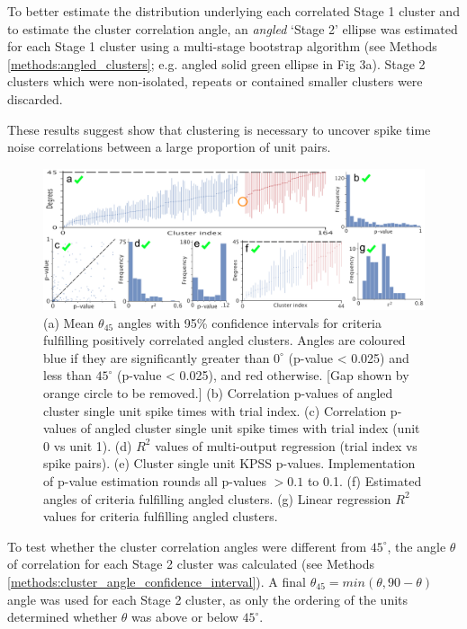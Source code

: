 \documentclass{article}
\begin{document}
To better estimate the distribution underlying each correlated Stage 1 cluster and to estimate the cluster correlation angle, an \textit{angled} `Stage 2' ellipse was estimated for each Stage 1 cluster using a multi-stage bootstrap algorithm (see Methods \ref{methods:angled_clusters}; e.g. angled solid green ellipse in Fig 3a).
Stage 2 clusters which were non-isolated, repeats or contained smaller clusters were discarded. 

These results suggest show that clustering is necessary to uncover spike time noise correlations between a large proportion of unit pairs.

\begin{figure}[t!]
\centering
\includegraphics[width=\textwidth]{Figure4.pdf}
\caption{(a) Mean $\theta_{45}$ angles with 95\% confidence intervals for criteria fulfilling positively correlated angled clusters. Angles are coloured blue if they are significantly greater than $0^{\circ}$ (p-value < 0.025) and less than $45^{\circ}$ (p-value < 0.025), and red otherwise. [Gap shown by orange circle to be removed.] (b) Correlation p-values of angled cluster single unit spike times with trial index. (c) Correlation p-values of angled cluster single unit spike times with trial index (unit 0 vs unit 1). (d) $R^2$ values of multi-output regression (trial index vs spike pairs). (e) Cluster single unit KPSS p-values. Implementation of p-value estimation rounds all p-values $>0.1$ to 0.1. (f) Estimated angles of criteria fulfilling angled clusters. (g) Linear regression $R^2$ values for criteria fulfilling angled clusters.}
\label{fig:universe}
\end{figure}


To test whether the cluster correlation angles were different from $45^{\circ}$, the angle $\theta$ of correlation for each Stage 2 cluster was calculated (see Methods \ref{methods:cluster_angle_confidence_interval}). A final $\theta_{45} = min(\theta, 90-\theta)$ angle was used for each Stage 2 cluster, as only the ordering of the units determined whether $\theta$ was above or below $45^{\circ}$.
\end{document}
